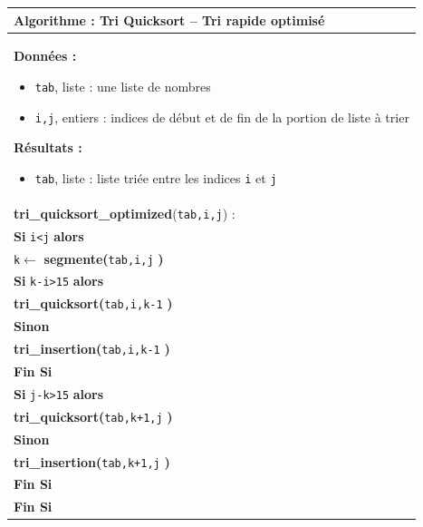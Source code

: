 \documentclass[10pt,fleqn]{article} %
\newcommand{\tsf}[1]{\small{\texttt{#1}}}
\begin{document}
\begin{pseudo}
\begin{tabular}{p{}}
\hline
\textbf{Algorithme :} Tri Quicksort -- Tri rapide optimisé\\
\hline
\textbf{Données :}
\begin{itemize}
\item \tsf{tab}, liste : une liste de nombres
\item \tsf{i,j}, entiers : indices de début et de fin de la portion de liste à trier
\end{itemize}
\textbf{Résultats :} 
\begin{itemize}
\item \tsf{tab}, liste : liste triée entre les indices \tsf{i} et \tsf{j}
\end{itemize}
\\
\textbf{tri\_quicksort\_optimized}(\tsf{tab,i,j}) :\\
\hspace{.4cm} \textbf{Si} \tsf{i<j} \textbf{alors} \\
\hspace{.8cm} \tsf{k$\leftarrow$} \textbf{segmente(}\tsf{tab,i,j} \textbf{)} \\
\hspace{.8cm} \textbf{Si} \tsf{k-i>15} \textbf{alors} \\
\hspace{1.2cm} \textbf{tri\_quicksort(}\tsf{tab,i,k-1} \textbf{)} \\
\hspace{.8cm} \textbf{Sinon} \\
\hspace{1.2cm} \textbf{tri\_insertion(}\tsf{tab,i,k-1} \textbf{)} \\
\hspace{.8cm} \textbf{Fin Si} \\
\hspace{.8cm} \textbf{Si} \tsf{j-k>15} \textbf{alors} \\
\hspace{1.2cm} \textbf{tri\_quicksort(}\tsf{tab,k+1,j} \textbf{)} \\
\hspace{.8cm} \textbf{Sinon} \\
\hspace{1.2cm} \textbf{tri\_insertion(}\tsf{tab,k+1,j} \textbf{)} \\
\hspace{.8cm} \textbf{Fin Si} \\
\hspace{.4cm} \textbf{Fin Si} \\
\hline
\end{tabular}
\end{pseudo}
\end{document}

